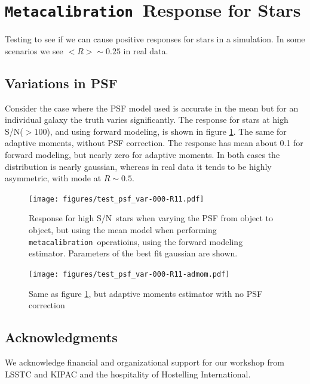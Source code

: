 \documentclass[\docopts]{\docclass}
\newcommand{\Mcal}{\texttt{Metacalibration}}
\newcommand{\mcal}{\texttt{metacalibration}}
\newcommand{\snr}{S/N}
\begin{document}
\section{\Mcal\ Response for Stars}

Testing to see if we can cause positive responses for stars in a simulation.
In some scenarios we see $<R> \sim 0.25$ in real data.

\subsection{Variations in PSF}

Consider the case where the PSF model used is accurate in the mean but 
for an individual galaxy the truth varies significantly.  The response
for stars at high \snr ($> 100$), and using forward modeling, is shown in
figure \ref{fig:Rstarfm}.  The same for adaptive moments, without
PSF correction. The response has mean about 0.1 for forward modeling,
but nearly zero for adaptive moments.  In both cases the distribution
is nearly gaussian, whereas in real data it tends to be highly asymmetric,
with mode at $R \sim 0.5$.


\begin{figure}[p]
    \centering
    \texttt{[image: figures/test\_psf\_var-000-R11.pdf]}

    \caption{Response for high \snr\ stars when varying the PSF from
    object to object, but using
    the mean model when performing \mcal\ operatioins, using the forward modeling estimator.
    Parameters of the best fit gaussian are shown. }

	\label{fig:Rstarfm}

\end{figure}
\begin{figure}[p]
    \centering
    \texttt{[image: figures/test\_psf\_var-000-R11-admom.pdf]}

    \caption{Same as figure \ref{fig:Rstarfm}, but adaptive moments estimator with no PSF correction}

	\label{fig:Rstaram}

\end{figure}




\subsection*{Acknowledgments}

We acknowledge financial and organizational support for our workshop from LSSTC and KIPAC and the hospitality of Hostelling International.





\end{document}
